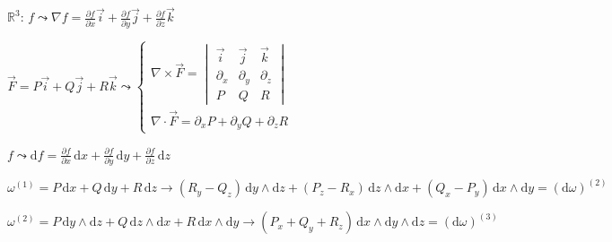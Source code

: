 
$\mathbb{R}^3$: $f\leadsto\nabla f=\frac{\partial f}{\partial x}\overrightarrow{i}+\frac{\partial f}{\partial y}\overrightarrow{j}+\frac{\partial f}{\partial z}\overrightarrow{k}$

$\overrightarrow{F}=P\overrightarrow{i}+Q\overrightarrow{j}+R\overrightarrow{k}\leadsto\begin{cases}
        \nabla\times\overrightarrow{F}=\begin{vmatrix}
                                           \overrightarrow{i} & \overrightarrow{j} & \overrightarrow{k} \\
                                           \partial_x         & \partial_y         & \partial_z         \\
                                           P                  & Q                  & R
                                       \end{vmatrix} \\
        \nabla\cdot\overrightarrow{F}=\partial_xP+\partial_yQ+\partial_zR
    \end{cases}$

$f\leadsto\mathrm{d}f=\frac{\partial f}{\partial x}\,\mathrm{d}x+\frac{\partial f}{\partial y}\,\mathrm{d}y+\frac{\partial f}{\partial z}\,\mathrm{d}z$

$\omega^{(1)}=P\,\mathrm{d}x+Q\,\mathrm{d}y+R\,\mathrm{d}z\rightarrow(R_y-Q_z)\,\mathrm{d}y\wedge\mathrm{d}z+(P_z-R_x)\,\mathrm{d}z\wedge\mathrm{d}x+(Q_x-P_y)\,\mathrm{d}x\wedge\mathrm{d}y=(\mathrm{d}\omega)^{(2)}$

$\omega^{(2)}=P\,\mathrm{d}y\wedge\mathrm{d}z+Q\,\mathrm{d}z\wedge\mathrm{d}x+R\,\mathrm{d}x\wedge\mathrm{d}y\rightarrow(P_x+Q_y+R_z)\,\mathrm{d}x\wedge\mathrm{d}y\wedge\mathrm{d}z=(\mathrm{d}\omega)^{(3)}$

